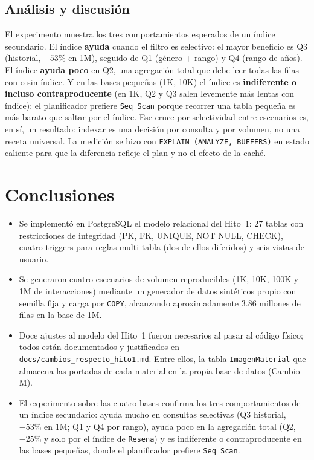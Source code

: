\documentclass[12pt,a4paper]{article}
\begin{document}
\subsection{Análisis y discusión}

El experimento muestra los tres comportamientos esperados de un índice
secundario. El índice \textbf{ayuda} cuando el filtro es selectivo: el mayor
beneficio es Q3 (historial, $-53\%$ en 1M), seguido de Q1 (género + rango) y Q4
(rango de años). El índice \textbf{ayuda poco} en Q2, una agregación total que
debe leer todas las filas con o sin índice. Y en las bases pequeñas (1K, 10K) el
índice es \textbf{indiferente o incluso contraproducente} (en 1K, Q2 y Q3 salen
levemente más lentas con índice): el planificador prefiere \texttt{Seq Scan}
porque recorrer una tabla pequeña es más barato que saltar por el índice. Ese
cruce por selectividad entre escenarios es, en sí, un resultado: indexar es una
decisión por consulta y por volumen, no una receta universal. La medición se hizo
con \texttt{EXPLAIN (ANALYZE, BUFFERS)} en estado caliente para que la diferencia
refleje el plan y no el efecto de la caché.

\section{Conclusiones}

\begin{itemize}
  \item Se implementó en PostgreSQL el modelo relacional del Hito~1: 27
  tablas con restricciones de integridad (PK, FK, UNIQUE, NOT NULL,
  CHECK), cuatro triggers para reglas multi-tabla (dos de ellos
  diferidos) y seis vistas de usuario.

  \item Se generaron cuatro escenarios de volumen reproducibles
  (1K, 10K, 100K y 1M de interacciones) mediante un generador de
  datos sintéticos propio con semilla fija y carga por \texttt{COPY},
  alcanzando aproximadamente 3.86 millones de filas en la base de 1M.

  \item Doce ajustes al modelo del Hito~1 fueron necesarios al pasar
  al código físico; todos están documentados y justificados en
  \texttt{docs/cambios\_respecto\_hito1.md}. Entre ellos, la tabla
  \texttt{ImagenMaterial} que almacena las portadas de cada material en la
  propia base de datos (Cambio M).

  \item El experimento sobre las cuatro bases confirma los tres
  comportamientos de un índice secundario: ayuda mucho en consultas
  selectivas (Q3 historial, $-53\%$ en 1M; Q1 y Q4 por rango), ayuda poco
  en la agregación total (Q2, $-25\%$ y solo por el índice de \texttt{Resena})
  y es indiferente o contraproducente en las bases pequeñas, donde el
  planificador prefiere \texttt{Seq Scan}.
\end{itemize}
\end{document}
